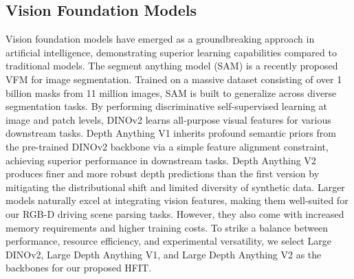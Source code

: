 \subsection{Vision Foundation Models}
\label{sec:DINOV2}
Vision foundation models have emerged as a groundbreaking approach in artificial intelligence, demonstrating superior learning capabilities compared to traditional models. The segment anything model (SAM) \cite{kirilloV2023segment} is a recently proposed VFM for image segmentation. Trained on a massive dataset consisting of over 1 billion masks from 11 million images, SAM is built to generalize across diverse segmentation tasks. By performing discriminative self-supervised learning at image and patch levels, DINOv2 \cite{oquab2023dinoV2} learns all-purpose visual features for various downstream tasks. Depth Anything V1 \cite{yang2024depth} inherits profound semantic priors from the pre-trained DINOv2 backbone via a simple feature alignment constraint, achieving superior performance in downstream tasks. Depth Anything V2 \cite{yang2024depth2} produces finer and more robust depth predictions than the first version by mitigating the distributional shift and limited diversity of synthetic data. Larger models naturally excel at integrating vision features, making them well-suited for our RGB-D driving scene parsing tasks. However, they also come with increased memory requirements and higher training costs. To strike a balance between performance, resource efficiency, and experimental versatility, we select Large DINOv2, Large Depth Anything V1, and Large Depth Anything V2 as the backbones for our proposed HFIT.